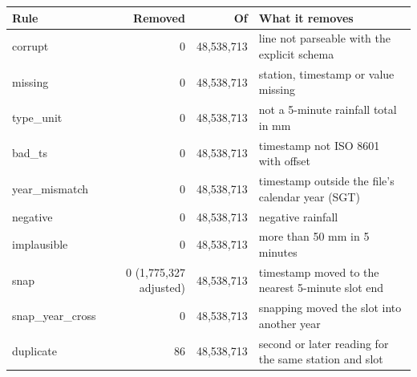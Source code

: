 \begin{tabular}{lrrp{7.3cm}}
\toprule
Rule & Removed & Of & What it removes \\
\midrule
corrupt & 0 & 48{,}538{,}713 & line not parseable with the explicit schema \\
missing & 0 & 48{,}538{,}713 & station, timestamp or value missing \\
type\_unit & 0 & 48{,}538{,}713 & not a 5-minute rainfall total in mm \\
bad\_ts & 0 & 48{,}538{,}713 & timestamp not ISO 8601 with offset \\
year\_mismatch & 0 & 48{,}538{,}713 & timestamp outside the file's calendar year (SGT) \\
negative & 0 & 48{,}538{,}713 & negative rainfall \\
implausible & 0 & 48{,}538{,}713 & more than 50 mm in 5 minutes \\
snap & 0 (1{,}775{,}327 adjusted) & 48{,}538{,}713 & timestamp moved to the nearest 5-minute slot end \\
snap\_year\_cross & 0 & 48{,}538{,}713 & snapping moved the slot into another year \\
duplicate & 86 & 48{,}538{,}713 & second or later reading for the same station and slot \\
\bottomrule
\end{tabular}
